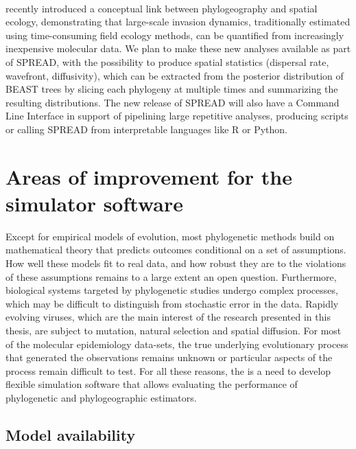 \paragraph{}
\cite{Pybus2012} recently introduced a conceptual link between phylogeography and spatial ecology, demonstrating that large-scale invasion dynamics, traditionally estimated using time-consuming field ecology methods, can be quantified from increasingly inexpensive molecular data.
We plan to make these new analyses available as part of SPREAD, with the possibility to produce spatial statistics (dispersal rate, wavefront, diffusivity), which can be extracted from the posterior distribution of BEAST trees by slicing each phylogeny at multiple times and summarizing the resulting distributions.
The new release of SPREAD will also have a Command Line Interface in support of pipelining large repetitive analyses, producing scripts or calling SPREAD from interpretable languages like R \citep{RCran} or Python.


\section{Areas of improvement for the {\bussname} simulator software\label{sec:buss_future}}

Except for empirical models of evolution, most phylogenetic methods build on mathematical theory that predicts outcomes conditional on a set of assumptions.
How well these models fit to real data, and how robust they are to the violations of these assumptions remains to a large extent an open question.
Furthermore, biological systems targeted by phylogenetic studies undergo complex processes, which may be difficult to distinguish from stochastic error in the data.
Rapidly evolving viruses, which are the main interest of the research presented in this thesis, are subject to mutation, natural selection and spatial diffusion.
For most of the molecular epidemiology data-sets, the true underlying evolutionary process that generated the observations remains unknown or particular aspects of the process remain difficult to test.
For all these reasons, the is a need to develop flexible simulation software that allows evaluating the performance of phylogenetic and phylogeographic estimators.

\subsection{Model availability}

